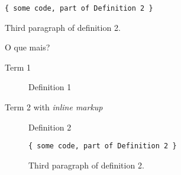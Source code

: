 \documentclass{article}
\begin{document}
\begin{multicols*}{4}
\begin{description}
\begin{verbatim}
{ some code, part of Definition 2 }
\end{verbatim}

Third paragraph of definition 2.
\end{description}

O que mais?

\begin{description}
\item[Term 1]
Definition 1
\item[Term 2 with \emph{inline markup}]
Definition 2

\begin{verbatim}
{ some code, part of Definition 2 }
\end{verbatim}

Third paragraph of definition 2.
\end{description}



\end{multicols*}
\end{document}
